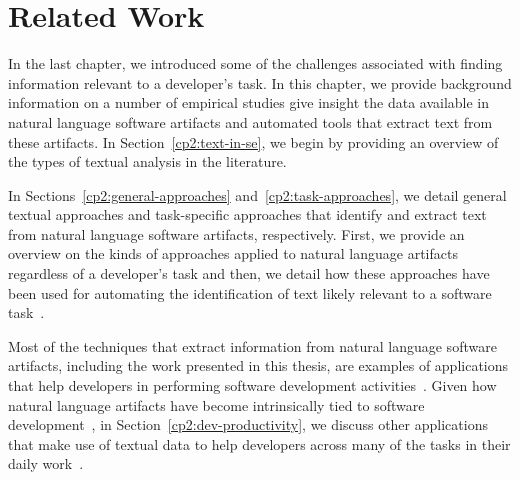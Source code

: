 \setcounter{chapter}{1}


\chapter{Related Work}
\label{ch:related-work}







In the last chapter, we introduced some of the challenges
associated with finding
information relevant to a developer's task.
In this chapter, we provide background information on 
a number of empirical studies give insight 
the data available in natural language software artifacts 
and automated tools that extract text from these artifacts.
In Section~\ref{cp2:text-in-se}, we begin by providing an  
overview of the types of textual analysis in the literature.




In Sections~\ref{cp2:general-approaches}
and~\ref{cp2:task-approaches}, we
detail general textual approaches 
and task-specific approaches
that identify and extract text from natural language software artifacts, respectively.
First, we provide an overview on the kinds of approaches 
applied to natural language artifacts regardless of a developer's task 
and then, we detail how these approaches 
have been used for automating the identification of text 
likely relevant to a software task~\cite{a}.






Most of the techniques that extract information from natural language software artifacts, including the work presented in this thesis, 
are examples of applications that help developers in performing 
software development activities~\cite{Meyer2017}. 
Given how 
natural language artifacts have become intrinsically
tied to software development~\cite{liu2021, watson2022, umarji2008archetypal},
in Section~\ref{cp2:dev-productivity}, 
we discuss
other applications that make use of textual data
to help developers
across many of the tasks in their daily work~\cite{Treude2016,  robillard2017, silva2019}.




% 
% 

